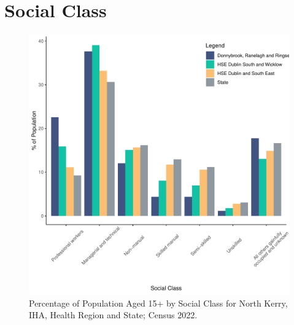 \documentclass{article}
\begin{document}
\section{Social Class}\label{sect:SC}
\begin{figure}[H]
	\centering
	\includegraphics[width = 140mm]{../figures/SocialClassED.pdf}
	\caption{Percentage of Population Aged 15+ by Social Class for North Kerry, IHA, Health Region and State; Census 2022.}
	\label{fig:vbnv}
	\end{figure}
\end{document}
